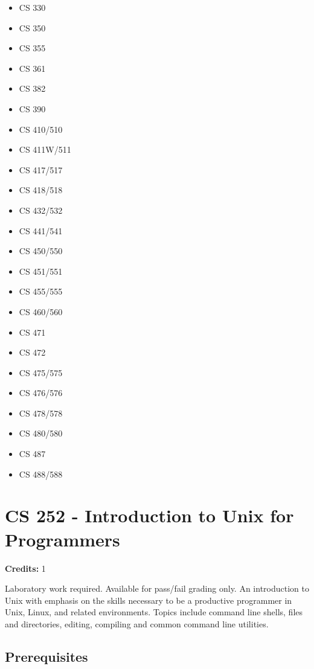 \documentclass[]{article}
\providecommand{\tightlist}{%
  \setlength{\itemsep}{0pt}\setlength{\parskip}{0pt}}
\begin{document}
\begin{multicols}{2}
\begin{itemize}
\tightlist
\item
  CS 330
\item
  CS 350
\item
  CS 355
\item
  CS 361
\item
  CS 382
\item
  CS 390
\item
  CS 410/510
\item
  CS 411W/511
\item
  CS 417/517
\item
  CS 418/518
\item
  CS 432/532
\item
  CS 441/541
\item
  CS 450/550
\item
  CS 451/551
\item
  CS 455/555
\item
  CS 460/560
\item
  CS 471
\item
  CS 472
\item
  CS 475/575
\item
  CS 476/576
\item
  CS 478/578
\item
  CS 480/580
\item
  CS 487
\item
  CS 488/588
\end{itemize}
\end{multicols}


\section{CS 252 - Introduction to Unix for
Programmers}\label{cs-252---introduction-to-unix-for-programmers}

\textbf{Credits:} 1

Laboratory work required. Available for pass/fail grading only. An
introduction to Unix with emphasis on the skills necessary to be a
productive programmer in Unix, Linux, and related environments. Topics
include command line shells, files and directories, editing, compiling
and common command line utilities.

\subsection{Prerequisites}\label{prerequisites-9}
\end{document}
